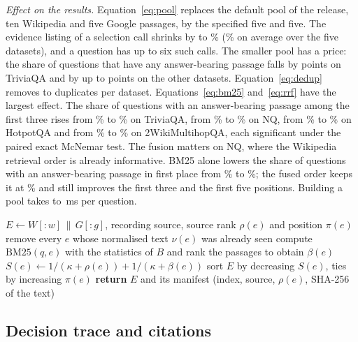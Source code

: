 \emph{Effect on the results.} Equation~\eqref{eq:pool} replaces the default pool of the release, ten Wikipedia and five Google passages, by the specified five and five. The evidence listing of a selection call shrinks by \VTokRedMin{} to \VTokRedMax\% (\VTokRedMean\% on average over the five datasets), and a question has up to six such calls. The smaller pool has a price: the share of questions that have any answer-bearing passage falls by \VCoverLossTQA{} points on TriviaQA and by up to \VCoverLossMax{} points on the other datasets. Equation~\eqref{eq:dedup} removes \VDupMin{} to \VDupMax{} duplicates per dataset. Equations~\eqref{eq:bm25} and~\eqref{eq:rrf} have the largest effect. The share of questions with an answer-bearing passage among the first three rises from \VCovThreeOrigTQA\% to \VCovThreeRrfTQA\% on TriviaQA, from \VCovThreeOrigNQ\% to \VCovThreeRrfNQ\% on NQ, from \VCovThreeOrigHQA\% to \VCovThreeRrfHQA\% on HotpotQA and from \VCovThreeOrigWMQ\% to \VCovThreeRrfWMQ\% on 2WikiMultihopQA, each significant under the paired exact McNemar test. The fusion matters on NQ, where the Wikipedia retrieval order is already informative. BM25 alone lowers the share of questions with an answer-bearing passage in first place from \VCovOneOrigNQ\% to \VCovOneBmNQ\%; the fused order keeps it at \VCovOneRrfNQ\% and still improves the first three and the first five positions. Building a pool takes \VBuildXMin{} to \VBuildXMax\,ms per question.

\begin{algorithm}[!htbp]
\caption{BuildPool, the evidence governor (Eqs.~\ref{eq:pool}--\ref{eq:rrf})}
\label{alg:pool}
$E \leftarrow W[{:}w] \,\|\, G[{:}g]$, recording source, source rank $\rho(e)$ and position $\pi(e)$\;
remove every $e$ whose normalised text $\nu(e)$ was already seen\;
compute $\mathrm{BM25}(q,e)$ with the statistics of $B$ and rank the passages to obtain $\beta(e)$\;
$S(e) \leftarrow 1/(\kappa+\rho(e)) + 1/(\kappa+\beta(e))$\;
sort $E$ by decreasing $S(e)$, ties by increasing $\pi(e)$\;
\textbf{return} $E$ and its manifest (index, source, $\rho(e)$, SHA-256 of the text)\;
\end{algorithm}

\subsection{Decision trace and citations}
\label{sec:m_trace}

